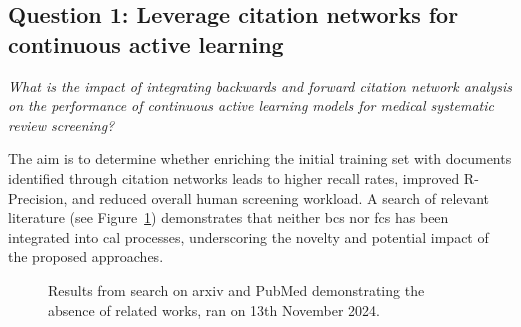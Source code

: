 \documentclass[10pt,oneside]{book}
\begin{document}
\subsection{Question 1: Leverage citation networks for continuous active learning}

\emph{What is the impact of integrating backwards and forward citation network analysis on the performance of continuous active learning models for medical systematic review screening?}

The aim is to determine whether enriching the initial training set with documents identified through citation networks leads to higher recall rates, improved R-Precision, and reduced overall human screening workload. A search of relevant literature (see Figure \ref{fig:search-results}) demonstrates that neither \gls*{bcs} nor \gls*{fcs} has been integrated into \gls*{cal} processes, underscoring the novelty and potential impact of the proposed approaches.


\begin{figure}[htbp]
    \centering
    \caption{Results from search on arxiv and PubMed demonstrating the absence of related works, ran on 13th November 2024.}
    \label{fig:search-results}
\end{figure}
\end{document}

